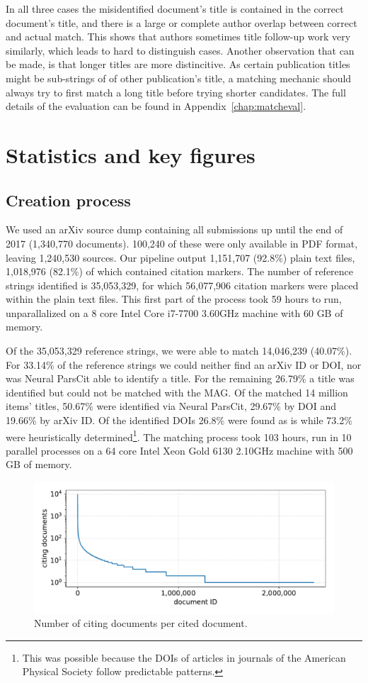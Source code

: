 In all three cases the misidentified document’s title is contained in the correct document’s title, and there is a large or complete author overlap between correct and actual match. This shows that authors sometimes title follow-up work very similarly, which leads to hard to distinguish cases. Another observation that can be made, is that longer titles are more distincitive. As certain publication titles might be sub-strings of of other publication's title, a matching mechanic should always try to first match a long title before trying shorter candidates. The full details of the evaluation can be found in Appendix~\ref{chap:matcheval}.

\section{Statistics and key figures}

\subsection{Creation process}
We used an arXiv source dump containing all submissions up until the end of 2017 (1,340,770 documents). 100,240 of these were only available in PDF format, leaving 1,240,530 sources. Our pipeline output 1,151,707 (92.8\%) plain text files, 1,018,976 (82.1\%) of which contained citation markers. The number of reference strings identified is 35,053,329, for which 56,077,906 citation markers were placed within the plain text files. This first part of the process took 59 hours to run, unparallalized on a 8 core Intel Core i7-7700 3.60GHz machine with 60 GB of memory.

Of the 35,053,329 reference strings, we were able to match 14,046,239 (40.07\%). For 33.14\% of the reference strings we could neither find an arXiv ID or DOI, nor was Neural ParsCit able to identify a title. For the remaining 26.79\% a title was identified but could not be matched with the MAG. Of the matched 14 million items' titles, 50.67\% were identified via Neural ParsCit, 29.67\% by DOI and 19.66\% by arXiv ID. Of the identified DOIs 26.8\% were found as is while 73.2\% were heuristically determined\footnote{This was possible because the DOIs of articles in journals of the American Physical Society follow predictable patterns.}. The matching process took 103 hours, run in 10 parallel processes on a 64 core Intel Xeon Gold 6130 2.10GHz machine with 500 GB of memory.

\begin{figure}
  \centering
  \includegraphics[width=0.8\linewidth]{figures/dataset/citing_docs_per_cited_doc.pdf}
  \caption{Number of citing documents per cited document.}
  \label{fig:numcitdoc}
\end{figure}

